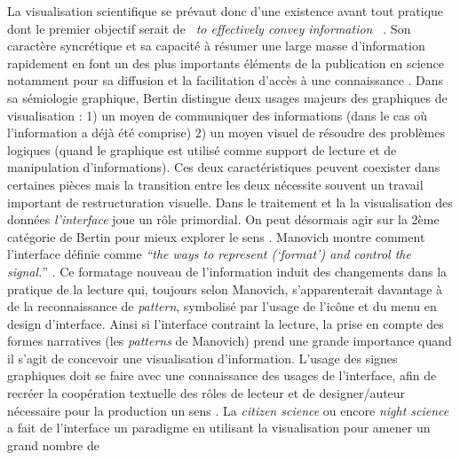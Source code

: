La visualisation scientifique se pr\'evaut donc d{\textquoteright}une
existence avant tout pratique dont le premier objectif serait de
\textit{{\guillemotleft}~to effectively convey
information~{\guillemotright}} \citep{Kelleher2011}. Son
caract\`ere syncr\'etique et sa capacit\'e \`a r\'esumer une large
masse d{\textquoteright}information rapidement en font un des plus
importants \'el\'ements de la publication en science notamment pour sa
diffusion et la facilitation d{\textquoteright}acc\`es \`a une
connaissance \citep{Ware2004}. Dans sa s\'emiologie graphique, Bertin
\citep{Bertin1977} distingue deux usages majeurs des graphiques de visualisation :
1) un moyen de communiquer des informations (dans le cas o\`u
l{\textquoteright}information a d\'ej\`a \'et\'e comprise) 2) un moyen
visuel de r\'esoudre des probl\`emes logiques (quand le graphique est
utilis\'e comme support de lecture et de manipulation
d{\textquoteright}informations). Ces deux caract\'eristiques peuvent
coexister dans certaines pi\`eces mais la transition entre les deux
n\'ecessite souvent un travail important de restructuration visuelle.
Dans le traitement et la la visualisation des donn\'ees
\textit{l{\textquoteright}interface }joue un r\^ole primordial. On peut
d\'esormais agir sur la 2\`eme cat\'egorie de Bertin pour mieux
explorer le sens \citep{Weissberg2007}. Manovich montre comment
l{\textquoteright}interface d\'efinie comme
\textit{{\textquotedblleft}the ways to represent
({\textquoteleft}format{\textquoteright}) and control the
signal.}{\textquotedblright} \citep{Manovich2013}. Ce formatage nouveau de
l{\textquoteright}information induit des changements dans la pratique
de la lecture qui, toujours selon Manovich,
s{\textquoteright}apparenterait davantage \`a de la reconnaissance de
\textit{pattern}, symbolis\'e par l{\textquoteright}usage de
l{\textquoteright}ic\^one et du menu en design
d{\textquoteright}interface. Ainsi si l{\textquoteright}interface
contraint la lecture, la prise en compte des formes narratives (les
\textit{patterns} de Manovich) prend une grande importance quand il
s{\textquoteright}agit de concevoir une visualisation
d{\textquoteright}information. L{\textquoteright}usage des signes
graphiques doit se faire avec une connaissance des usages de
l{\textquoteright}interface, afin de recr\'eer la coop\'eration
textuelle des r\^oles de lecteur et de designer/auteur n\'ecessaire
pour la production un sens \citep{Eco1985}. La \textit{citizen science} ou
encore \textit{night science} a fait de l{\textquoteright}interface un
paradigme en utilisant la visualisation pour amener un grand nombre de
